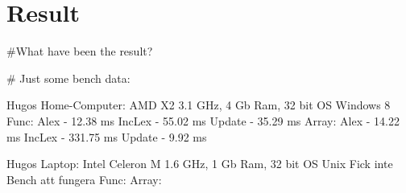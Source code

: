 \chapter{Result}
\#What have been the result?

\# Just some bench data:

Hugos Home-Computer: AMD X2 3.1 GHz, 4 Gb Ram, 32 bit OS Windows 8
Func:
  Alex - 12.38 ms
  IncLex - 55.02 ms
  Update - 35.29 ms
Array:
  Alex - 14.22 ms
  IncLex - 331.75 ms
  Update - 9.92 ms

Hugos Laptop: Intel Celeron M 1.6 GHz, 1 Gb Ram, 32 bit OS Unix
Fick inte Bench att fungera
Func:
Array:


